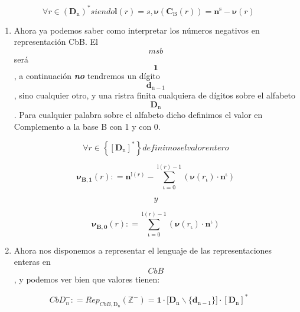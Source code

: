 \begin{enumerate}
\begin{enumerate}
\begin{enumerate}
      \[\forall{\mathit{r} \in \left( \mathbf{D}_{\mathbf{\mathrm{n}}} \right)^{\ast}}\mathit{siendo}\mathbf{l}{{(\mathit{r})} = s},\mathbf{\nu}{{({\mathbf{C}_{\mathbf{\mathrm{Β}}}{(\mathit{r})}})} = {\mathbf{n}^{\mathbf{\mathrm{s}}} - \mathbf{\nu}}}{(\mathit{r})}\]

      \begin{enumerate}
      \def\labelenumiv{\arabic{enumiv}.}
      \setcounter{enumiv}{1}
      \item
        Ahora ya podemos saber como interpretar los números negativos en
        represen\-tación CbB. El \[\mathbf{\mathit{msb}}\]será
        \[\mathbf{1}\], a continuación \emph{\textbf{no}} tendremos un
        dígito \[\mathbf{d}_{\mathbf{\mathrm{n - 1}}}\], sino cualquier
        otro, y una ristra finita cualquiera de dígitos sobre el
        alfabeto \[\mathbf{D}_{\mathbf{\mathrm{n}}}\]. Para cualquier
        palabra sobre el alfabeto dicho definimos el valor en
        Complemento a la base B con 1 y con 0.

        \[\forall{\mathit{r} \in \left\{ \left\lbrack \mathbf{D}_{\mathbf{\mathrm{n}}} \right\rbrack^{\mathbf{\mathrm{\ast}}} \right\}}\mathit{definimos}\mathit{el}\mathit{valor}\mathit{entero}\]

        \[\mathbf{\nu_{Β,1}}{(\mathit{r})}{: =}{\mathbf{n}^{\mathbf{\mathrm{l}}{(\mathit{r})}} - {\sum\limits_{\mathbf{\mathrm{\iota = 0}}}^{{\mathbf{\mathrm{l}}{(\mathit{r})}} - \mathbf{\mathrm{1}}}{({\mathbf{\nu}{{(\mathit{r}_{\mathbf{\mathrm{\iota}}})} \cdot \mathbf{n}^{\mathbf{\mathrm{\iota}}}}})}}}\]

        \[y\]

        \[\mathbf{\nu_{Β,0}}{(\mathit{r})}{: =}{\sum\limits_{\mathbf{\mathrm{\iota = 0}}}^{{\mathbf{\mathrm{l}}{(\mathit{r})}} - \mathbf{\mathrm{1}}}{({\mathbf{\nu}{{(\mathit{r}_{\mathbf{\mathrm{\iota}}})} \cdot \mathbf{n}^{\mathbf{\mathrm{\iota}}}}})}}\]
      \item
        Ahora nos disponemos a representar el lenguaje de las
        representaciones ente\-ras en \[CbB\], y podemos ver bien que
        valores tienen:
      \end{enumerate}

      \[\mathit{CbD}_{n}^{-}{: =}\mathit{Rep}_{\mathit{CbB},\mathbf{\mathrm{D}}_{\mathbf{\mathrm{n}}}}{(\mathbb{Z}^{\mathbf{\mathrm{-}}})}{=}{{\mathbf{1} \cdot {\lbrack{\mathbf{D}_{\mathbf{\mathrm{n}}} \smallsetminus {\{\mathbf{d}_{\mathbf{\mathrm{n - 1}}}\}}}\rbrack}} \cdot \left\lbrack \mathbf{D}_{\mathbf{\mathrm{n}}} \right\rbrack^{\mathbf{\mathrm{\ast}}}}\]


\end{enumerate}
\end{enumerate}
\end{enumerate}

